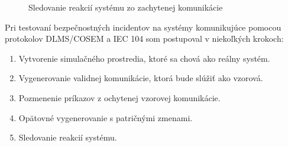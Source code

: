 \begin{figure}[h]
    \centering
    \caption{Sledovanie reakcií systému zo zachytenej komunikácie}
    \label{monitoring}
\end{figure}
Pri testovaní bezpečnostných incidentov na systémy komunikujúce pomocou protokolov DLMS/COSEM a IEC 104 som postupoval v niekoľkých krokoch:
\begin{enumerate}
\item Vytvorenie simulačného prostredia, ktoré sa chová ako reálny systém.
\item Vygenerovanie validnej komunikácie, ktorá bude slúžiť ako vzorová.
\item Pozmenenie príkazov z ochytenej vzorovej komunikácie.
\item Opätovné vygenerovanie s patričnými zmenami.
\item Sledovanie reakcií systému.
\end{enumerate}

